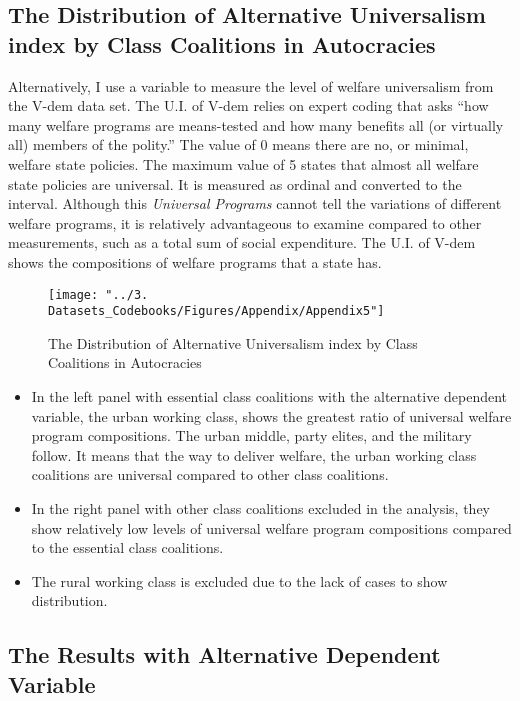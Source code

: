 \documentclass[12pt]{article}
\begin{document}
	\subsection{The Distribution of Alternative Universalism index by Class Coalitions in Autocracies}
	Alternatively, I use a variable to measure the level of welfare universalism from the V-dem data set. The U.I. of V-dem relies on expert coding that asks ``how many welfare programs are means-tested and how many benefits all (or virtually all) members of the polity.'' The value of 0 means there are no, or minimal, welfare state policies. The maximum value of 5 states that almost all welfare state policies are universal. It is measured as ordinal and converted to the interval. Although this \textit{Universal Programs} cannot tell the variations of different welfare programs, it is relatively advantageous to examine compared to other measurements, such as a total sum of social expenditure. The U.I. of V-dem shows the compositions of welfare programs that a state has.
	
	\begin{figure}[!ht]
		\centering
		\texttt{[image: "../3. Datasets\_Codebooks/Figures/Appendix/Appendix5"]}
		\caption{The Distribution of Alternative Universalism index by Class Coalitions in Autocracies}
		\label{fig:figure9}
	\end{figure}
	
	\begin{itemize}
		\item In the left panel with essential class coalitions with the alternative dependent variable, the urban working class, shows the greatest ratio of universal welfare program compositions. The urban middle, party elites, and the military follow. It means that the way to deliver welfare, the urban working class coalitions are universal compared to other class coalitions.
		\item In the right panel with other class coalitions excluded in the analysis, they show relatively low levels of universal welfare program compositions compared to the essential class coalitions.
		\item The rural working class is excluded due to the lack of cases to show distribution.
	\end{itemize}
	
	\subsection{The Results with Alternative Dependent Variable}
	
\end{document}
